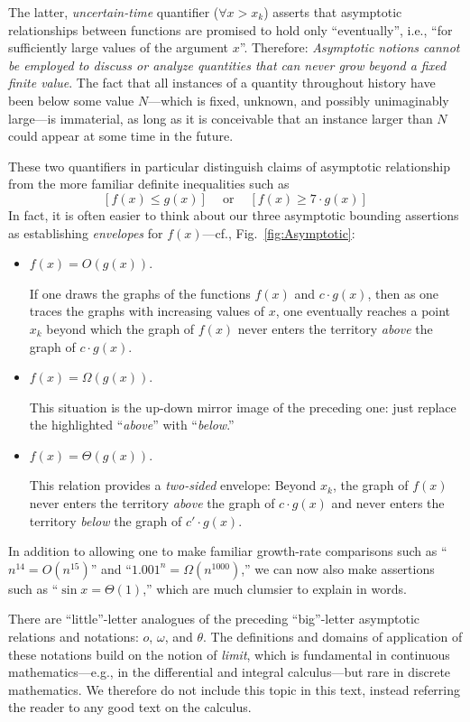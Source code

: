 \smallskip

The latter, {\em uncertain-time} quantifier ($\forall x > x_k$) asserts that asymptotic relationships between functions are promised to hold only ``eventually'', i.e., ``for sufficiently large values of the argument $x$''.  Therefore:  {\em Asymptotic notions cannot be employed to discuss or analyze quantities that can never grow beyond a fixed finite value}.  The fact that all instances of a quantity throughout history have been below some value $N$---which is fixed, unknown, and possibly unimaginably large---is immaterial, as long as it is conceivable that an instance larger than $N$ could appear at some time in the future.

\smallskip

These two quantifiers in particular distinguish claims of asymptotic relationship from the more familiar definite inequalities such as
\[ [f(x) \leq g(x)] \ \ \ \ \mbox{ or } \ \ \ \ [f(x) \geq 7 \cdot g(x)] \]
In fact, it is often easier to think about our three asymptotic bounding assertions as establishing {\em envelopes} for $f(x)$---cf., Fig.~\ref{fig:Asymptotic}:
\begin{itemize}
\item
$f(x) = O(g(x))$.

If one draws the graphs of the functions $f(x)$ and $c \cdot g(x)$, then as one traces the graphs with increasing values of $x$, one eventually reaches a point $x_k$ beyond which the graph of $f(x)$ never enters the territory {\em above} the graph of $c \cdot g(x)$.
\medskip\item
$f(x) = \Omega(g(x))$.

This situation is the up-down mirror image of the preceding one: just replace the highlighted ``{\em above}'' with ``{\em below}.''
\medskip\item
$f(x) = \Theta(g(x))$.

This relation provides a {\em two-sided} envelope:  Beyond $x_k$, the graph of $f(x)$ never enters the territory {\em above} the graph of $c \cdot g(x)$ and never enters the territory
{\em below} the graph of $c' \cdot g(x)$.
\end{itemize}
In addition to allowing one to make familiar growth-rate comparisons such as ``$n^{14} = O(n^{15})$'' and ``$1.001^n = \Omega(n^{1000})$,'' we can now also make assertions such as ``$\sin x = \Theta(1)$,'' which are much clumsier to explain in words.

\medskip

There are ``little''-letter analogues of the preceding ``big''-letter asymptotic relations and notations: $o$, $\omega$, and $\theta$.  The definitions and domains of application of these notations build on the notion of {\it limit}, which is fundamental in continuous mathematics---e.g., in the differential and integral calculus---but rare in discrete mathematics.  We therefore do not include this topic in this text, instead referring the reader to any good text on the calculus.

